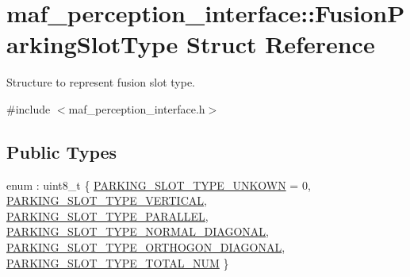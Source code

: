 \hypertarget{structmaf__perception__interface_1_1FusionParkingSlotType}{}\section{maf\+\_\+perception\+\_\+interface\+:\+:Fusion\+Parking\+Slot\+Type Struct Reference}
\label{structmaf__perception__interface_1_1FusionParkingSlotType}


Structure to represent fusion slot type.  




{\ttfamily \#include $<$maf\+\_\+perception\+\_\+interface.\+h$>$}

\subsection*{Public Types}
\begin{DoxyCompactItemize}
\item 
enum \+: uint8\+\_\+t \{ \newline
\hyperlink{structmaf__perception__interface_1_1FusionParkingSlotType_aae7208b0aece9e651b2aadf707bf3b9aa7b0c668e3d19dcb3de9390e16b2b2b37}{P\+A\+R\+K\+I\+N\+G\+\_\+\+S\+L\+O\+T\+\_\+\+T\+Y\+P\+E\+\_\+\+U\+N\+K\+O\+WN} = 0, 
\hyperlink{structmaf__perception__interface_1_1FusionParkingSlotType_aae7208b0aece9e651b2aadf707bf3b9aa8b839902a2b0cd1db968c0d781833454}{P\+A\+R\+K\+I\+N\+G\+\_\+\+S\+L\+O\+T\+\_\+\+T\+Y\+P\+E\+\_\+\+V\+E\+R\+T\+I\+C\+AL}, 
\hyperlink{structmaf__perception__interface_1_1FusionParkingSlotType_aae7208b0aece9e651b2aadf707bf3b9aacac418da0f783a049753128fb23f7477}{P\+A\+R\+K\+I\+N\+G\+\_\+\+S\+L\+O\+T\+\_\+\+T\+Y\+P\+E\+\_\+\+P\+A\+R\+A\+L\+L\+EL}, 
\hyperlink{structmaf__perception__interface_1_1FusionParkingSlotType_aae7208b0aece9e651b2aadf707bf3b9aa518da477309256a1cf5b9ee8544ded96}{P\+A\+R\+K\+I\+N\+G\+\_\+\+S\+L\+O\+T\+\_\+\+T\+Y\+P\+E\+\_\+\+N\+O\+R\+M\+A\+L\+\_\+\+D\+I\+A\+G\+O\+N\+AL}, 
\newline
\hyperlink{structmaf__perception__interface_1_1FusionParkingSlotType_aae7208b0aece9e651b2aadf707bf3b9aa8287950ad91ace94734a8a67b39dc34c}{P\+A\+R\+K\+I\+N\+G\+\_\+\+S\+L\+O\+T\+\_\+\+T\+Y\+P\+E\+\_\+\+O\+R\+T\+H\+O\+G\+O\+N\+\_\+\+D\+I\+A\+G\+O\+N\+AL}, 
\hyperlink{structmaf__perception__interface_1_1FusionParkingSlotType_aae7208b0aece9e651b2aadf707bf3b9aa28c2081f0f156c05375b0564638a802d}{P\+A\+R\+K\+I\+N\+G\+\_\+\+S\+L\+O\+T\+\_\+\+T\+Y\+P\+E\+\_\+\+T\+O\+T\+A\+L\+\_\+\+N\+UM}
 \}
\end{DoxyCompactItemize}
